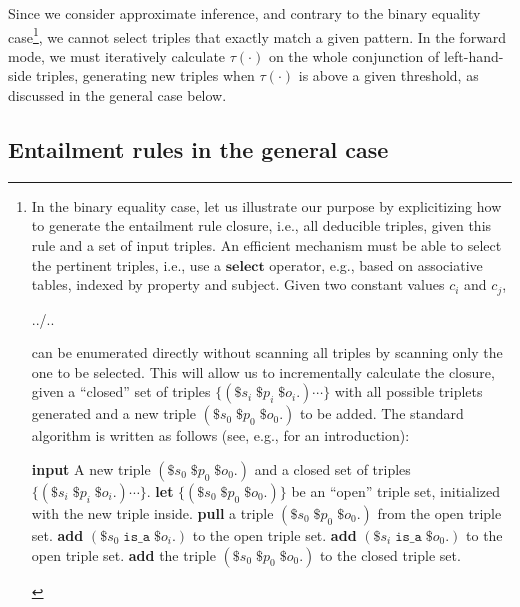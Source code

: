 \documentclass[sn-mathphys]{sn-jnl}
\begin{document}
Since we consider approximate inference, and contrary to the binary equality case\footnote{\label{closure} In the binary equality case, let us illustrate our purpose by explicitizing how to generate the entailment rule closure, i.e., all deducible triples, given this rule and a set of input triples. An efficient mechanism must be able to select the pertinent triples, i.e., use a $\textbf{select}$ operator, e.g., based on associative tables, indexed by property and subject. Given two constant values $c_i$ and $c_j$,
\begin{algorithmic}
\State ../..
\EndFor
\end{algorithmic}
can be enumerated directly without scanning all triples by scanning only the one to be selected. This will allow us to incrementally calculate the closure, given a ``closed'' set of triples $\{(\$s_i \; \$p_i \; \$o_i .) \cdots \}$ with all possible triplets generated and a new triple $(\$s_0 \; \$p_0 \; \$o_0 .)$ to be added. The standard algorithm is written as follows (see, e.g., \cite{kapoor_comparative_2016} for an introduction):
\begin{algorithmic}
\State \textbf{input} A new triple $(\$s_0 \; \$p_0 \; \$o_0 .)$ and a closed set of triples $\{(\$s_i \; \$p_i \; \$o_i .) \cdots \}$.
\State \textbf{let} $\{(\$s_0 \; \$p_0 \; \$o_0 .)\}$ be an ``open'' triple set, initialized with the new triple inside.
\Repeat
\State \textbf{pull} a triple $(\$s_0 \; \$p_0 \; \$o_0 .)$ from the open triple set.
\State \textbf{add} $(\$s_0 \; \texttt{is\_a} \; \$o_i .)$ to the open triple set.
\EndFor
{}
\State \textbf{add} $(\$s_i \; \texttt{is\_a} \; \$o_0 .)$ to the open triple set.
\EndFor
\EndIf
\State \textbf{add} the triple $(\$s_0 \; \$p_0 \; \$o_0 .)$ to the closed triple set.
\end{algorithmic}}, we cannot select triples that exactly match a given pattern. In the forward mode, we must iteratively calculate $\tau(\cdot)$ on the whole conjunction of left-hand-side triples, generating new triples when $\tau(\cdot)$ is above a given threshold, as discussed in the general case below.

\subsection{Entailment rules in the general case}
\end{document}
